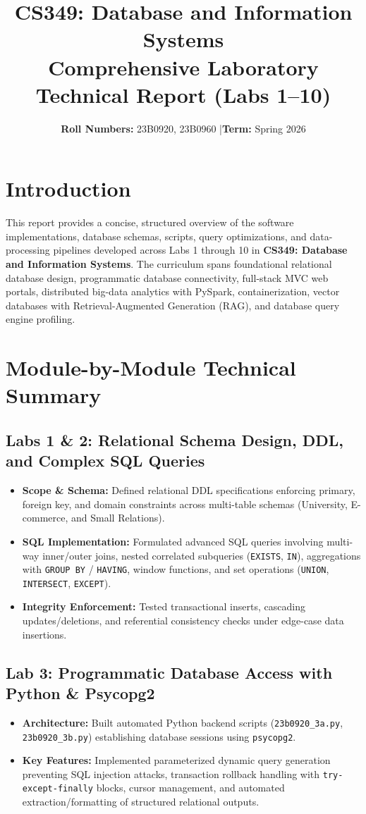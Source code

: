 \documentclass[10pt,a4paper]{article}
\title{\vspace{-1.8em}\Large\textbf{CS349: Database and Information Systems} \\ \large\textbf{Comprehensive Laboratory Technical Report (Labs 1--10)}\vspace{-0.6em}}
\author{\textbf{Roll Numbers:} 23B0920, 23B0960 \quad|\quad \textbf{Term:} Spring 2026}
\date{\vspace{-0.6em}}
\begin{document}
\maketitle
\vspace{-1.2em}

\section{Introduction}
This report provides a concise, structured overview of the software implementations, database schemas, scripts, query optimizations, and data-processing pipelines developed across Labs 1 through 10 in \textbf{CS349: Database and Information Systems}. The curriculum spans foundational relational database design, programmatic database connectivity, full-stack MVC web portals, distributed big-data analytics with PySpark, containerization, vector databases with Retrieval-Augmented Generation (RAG), and database query engine profiling.

\section{Module-by-Module Technical Summary}

\subsection{Labs 1 \& 2: Relational Schema Design, DDL, and Complex SQL Queries}
\begin{itemize}
    \item \textbf{Scope \& Schema:} Defined relational DDL specifications enforcing primary, foreign key, and domain constraints across multi-table schemas (University, E-commerce, and Small Relations).
    \item \textbf{SQL Implementation:} Formulated advanced SQL queries involving multi-way inner/outer joins, nested correlated subqueries (\texttt{EXISTS}, \texttt{IN}), aggregations with \texttt{GROUP BY} / \texttt{HAVING}, window functions, and set operations (\texttt{UNION}, \texttt{INTERSECT}, \texttt{EXCEPT}).
    \item \textbf{Integrity Enforcement:} Tested transactional inserts, cascading updates/deletions, and referential consistency checks under edge-case data insertions.
\end{itemize}

\subsection{Lab 3: Programmatic Database Access with Python \& Psycopg2}
\begin{itemize}
    \item \textbf{Architecture:} Built automated Python backend scripts (\texttt{23b0920\_3a.py}, \texttt{23b0920\_3b.py}) establishing database sessions using \texttt{psycopg2}.
    \item \textbf{Key Features:} Implemented parameterized dynamic query generation preventing SQL injection attacks, transaction rollback handling with \texttt{try-except-finally} blocks, cursor management, and automated extraction/formatting of structured relational outputs.
\end{itemize}
\end{document}
